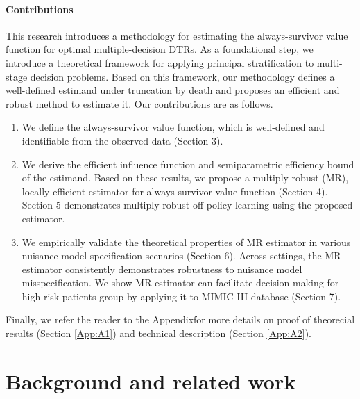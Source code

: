 \documentclass{article}
\newcommand{\supp}{\textrm{Appendix}}
\begin{document}
	
\paragraph{Contributions}
This research introduces a methodology for estimating the always-survivor value function for optimal multiple-decision DTRs. 
	As a foundational step, we introduce a theoretical framework for applying principal stratification to multi-stage decision problems.
	Based on this framework, our methodology defines a well-defined estimand under truncation by death and proposes an efficient and robust method to estimate it. 
	Our contributions are as follows.
	\begin{enumerate}
		\item We define the always-survivor value function, which is well-defined and identifiable from the observed data (Section 3).
		\item We derive the efficient influence function and semiparametric efficiency bound of the estimand. Based on these results, we propose a multiply robust (MR), locally efficient estimator for always-survivor value function (Section 4). 
		    Section 5 demonstrates multiply robust off-policy learning using the proposed estimator.
		\item We empirically validate the theoretical properties of MR estimator in various nuisance model specification scenarios (Section 6). Across settings, the MR estimator consistently demonstrates robustness to nuisance model misspecification. We show MR estimator can facilitate decision-making for high-risk patients group by applying it to MIMIC-III database (Section 7).
	\end{enumerate}

Finally, we refer the reader to the \supp\text{ }for more details on proof of theorecial results (Section \ref{App:A1}) and technical description (Section \ref{App:A2}).

	

%
%
\section{Background and related work}
%
\end{document}
